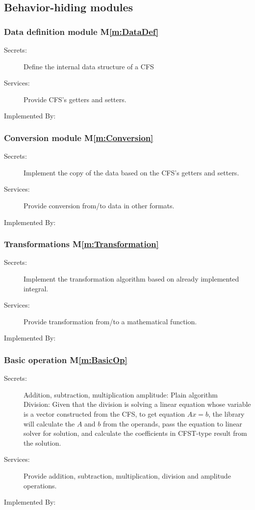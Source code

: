 \documentclass[12pt, titlepage]{article}
\newcommand{\mref}[1]{M\ref{m:#1}}
\begin{document}
\subsection{Behavior-hiding modules}
\subsubsection{Data definition module \mref{DataDef}}
\begin{description}
\item[Secrets:] Define the internal data structure of a CFS 
\item[Services:] Provide CFS's getters and setters.
\item[Implemented By:] \progname
\end{description}
\subsubsection{Conversion module \mref{Conversion}}
\begin{description}
	\item[Secrets:] Implement the copy of the data based on the CFS's getters and setters.
	\item[Services:] Provide conversion from/to data in other formats. 
	\item[Implemented By:] \progname
\end{description}
\subsubsection{Transformations \mref{Transformation}}
\begin{description}
	\item[Secrets:] Implement the transformation algorithm based on already implemented integral.
	\item[Services:] Provide transformation from/to a mathematical function.
	\item[Implemented By:] \progname
\end{description}
\subsubsection{Basic operation \mref{BasicOp}}
\begin{description}
	\item[Secrets:] Addition, subtraction, multiplication amplitude: Plain algorithm\\
	Division: Given that the division is solving a linear equation whose variable is a vector constructed from the CFS, to get equation $Ax=b$, the library will calculate the $A$ and $b$ from the operands, pass the equation to linear solver for solution, and calculate the coefficients in CFST-type result from the solution.
	\item[Services:] Provide addition, subtraction, multiplication, division and amplitude operations.
	\item[Implemented By:] \progname
\end{description}
\end{document}
